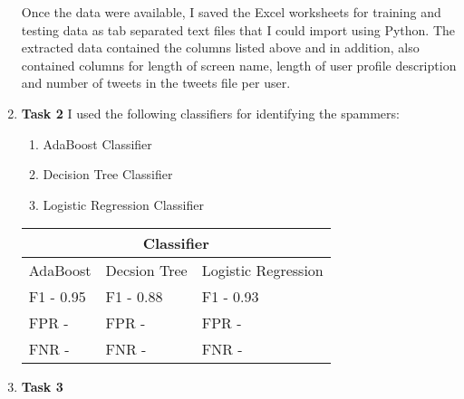 \documentclass[paper=a4, fontsize=11pt]{scrartcl} %
\numberwithin{equation}{section} %
\numberwithin{figure}{section} %
\numberwithin{table}{section} %
\begin{document}
\begin{enumerate}
Once the data were available, I saved the Excel worksheets for training and testing data as tab separated text files that I could import using Python. The extracted data contained the columns listed above and in addition, also contained columns for length of screen name, length of user profile description and number of tweets in the tweets file per user.  

\item \textbf{Task 2} I used the following classifiers for identifying the spammers:


\begin{enumerate}

\item AdaBoost Classifier

\item Decision Tree Classifier

\item Logistic Regression Classifier

\end{enumerate}

\begin{tabular}{ 
|p{4cm}|p{4cm}|p{4cm}|  }
 \hline
 \multicolumn{3}{|c|}{Classifier} \\
 \hline
 AdaBoost& Decsion Tree &Logistic Regression\\
 \hline
 F1 - 0.95   & F1 - 0.88    & F1 - 0.93 \\
 FPR - &   FPR -  & FPR -\\
 FNR - &FNR - & FNR -\\
 \hline
\end{tabular}

\item \textbf{Task 3}

\end{enumerate}


\end{document}
